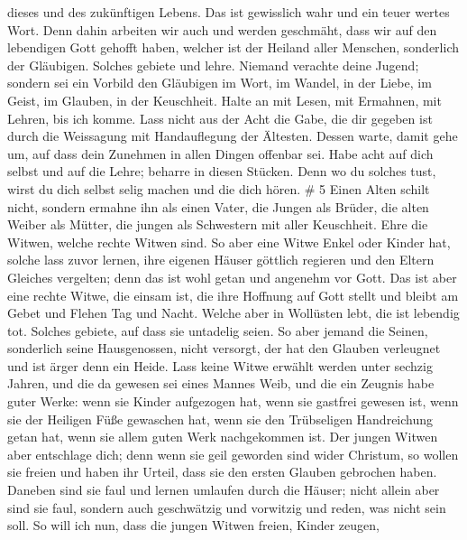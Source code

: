 dieses und des zukünftigen Lebens.  Das ist gewisslich wahr
und ein teuer wertes Wort.  Denn dahin arbeiten wir auch
und werden geschmäht, dass wir auf den lebendigen Gott gehofft haben,
welcher ist der Heiland aller Menschen, sonderlich der Gläubigen.
 Solches gebiete und lehre.  Niemand verachte
deine Jugend; sondern sei ein Vorbild den Gläubigen im Wort, im Wandel,
in der Liebe, im Geist, im Glauben, in der Keuschheit. 
Halte an mit Lesen, mit Ermahnen, mit Lehren, bis ich komme.
 Lass nicht aus der Acht die Gabe, die dir gegeben ist
durch die Weissagung mit Handauflegung der Ältesten. 
Dessen warte, damit gehe um, auf dass dein Zunehmen in allen Dingen
offenbar sei.  Habe acht auf dich selbst und auf die Lehre;
beharre in diesen Stücken. Denn wo du solches tust, wirst du dich selbst
selig machen und die dich hören. \# 5  Einen Alten schilt
nicht, sondern ermahne ihn als einen Vater, die Jungen als Brüder,
 die alten Weiber als Mütter, die jungen als Schwestern mit
aller Keuschheit.  Ehre die Witwen, welche rechte Witwen
sind.  So aber eine Witwe Enkel oder Kinder hat, solche lass
zuvor lernen, ihre eigenen Häuser göttlich regieren und den Eltern
Gleiches vergelten; denn das ist wohl getan und angenehm vor Gott.
 Das ist aber eine rechte Witwe, die einsam ist, die ihre
Hoffnung auf Gott stellt und bleibt am Gebet und Flehen Tag und Nacht.
 Welche aber in Wollüsten lebt, die ist lebendig tot.
 Solches gebiete, auf dass sie untadelig seien. 
So aber jemand die Seinen, sonderlich seine Hausgenossen, nicht
versorgt, der hat den Glauben verleugnet und ist ärger denn ein Heide.
 Lass keine Witwe erwählt werden unter sechzig Jahren, und
die da gewesen sei eines Mannes Weib,  und die ein Zeugnis
habe guter Werke: wenn sie Kinder aufgezogen hat, wenn sie gastfrei
gewesen ist, wenn sie der Heiligen Füße gewaschen hat, wenn sie den
Trübseligen Handreichung getan hat, wenn sie allem guten Werk
nachgekommen ist.  Der jungen Witwen aber entschlage dich;
denn wenn sie geil geworden sind wider Christum, so wollen sie freien
 und haben ihr Urteil, dass sie den ersten Glauben
gebrochen haben.  Daneben sind sie faul und lernen umlaufen
durch die Häuser; nicht allein aber sind sie faul, sondern auch
geschwätzig und vorwitzig und reden, was nicht sein soll. 
So will ich nun, dass die jungen Witwen freien, Kinder zeugen,
